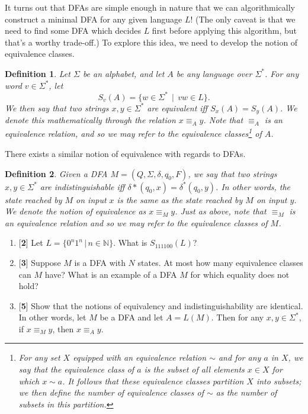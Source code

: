 \documentclass[11pt]{article}
\newtheorem{defn}{Definition}[section]
\newcounter{enum}
\begin{document}
\par It turns out that DFAs are simple enough in nature that we can algorithmically construct a minimal DFA for any given language $L$!  (The only caveat is that we need to find some DFA which decides $L$ first before applying this algorithm, but that's a worthy trade-off.)  To explore this idea, we need to develop the notion of equivalence classes.

\begin{defn}
Let $\Sigma$ be an alphabet, and let $A$ be any language over $\Sigma^*$.  For any word $v\in \Sigma^*$, let \[S_v(A)=\{w\in\Sigma^*\,\mid\, vw\in L\} .\] We then say that two strings $x,y\in\Sigma^*$ are \textit{equivalent} iff $S_x(A) = S_y(A)$.  We denote this mathematically through the relation $x\equiv_A y$.  Note that $\equiv_A$ is an equivalence relation, and so we may refer to the equivalence classes\footnote{For any set $X$ equipped with an equivalence relation $\sim$ and for any $a$ in $X$, we say that the equivalence class of $a$ is the subset of all elements $x\in X$ for which $x\sim a$.  It follows that these equivalence classes partition $X$ into subsets; we then define the number of equivalence classes of $\sim$ as the number of subsets in this partition.} of $A$.
\end{defn}

\par There exists a similar notion of equivalence with regards to DFAs.

\begin{defn}
Given a DFA $M=(Q,\Sigma,\delta, q_0, F)$, we say that two strings $x,y\in\Sigma^*$ are \textit{indistinguishable} iff $\delta*(q_0,x)=\delta^*(q_0,y)$.  In other words, the state reached by $M$ on input $x$ is the same as the state reached by $M$ on input $y$.  We denote the notion of equivalence as $x\equiv_M y$.  Just as above, note that $\equiv_M$ is an equivalence relation and so we may refer to the equivalence classes of $M$.
\end{defn}

\begin{enumerate}
\setcounter{enumi}{\theenum}

\item {[}\textbf{2}{]} Let $L=\{0^n1^n\,|\, n\in\mathbb{N}\}$.  What is $S_{111100}(L)$?

\item {[}\textbf{3}{]} Suppose $M$ is a DFA with $N$ states.  At most how many equivalence classes can $M$ have?  What is an example of a DFA $M$ for which equality does not hold?

\item {[}\textbf{5}{]} Show that the notions of equivalency and indistinguishability are identical.  In other words, let $M$ be a DFA and let $A=L(M)$.  Then for any $x,y\in\Sigma^*$, if $x\equiv_M y$, then $x\equiv_A y$.

\setcounter{enum}{\theenumi}
\end{enumerate}
\end{document}
